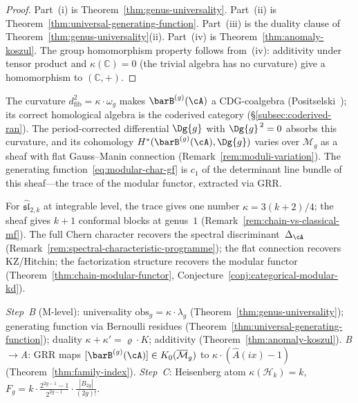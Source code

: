 \begin{proof}
Part~(i) is Theorem~\ref{thm:genus-universality}.
Part~(ii) is Theorem~\ref{thm:universal-generating-function}.
Part~(iii) is the duality clause of
Theorem~\ref{thm:genus-universality}(ii).
Part~(iv) is Theorem~\ref{thm:anomaly-koszul}.
The group homomorphism property follows from~(iv): additivity
under tensor product and $\kappa(\mathbb{C}) = 0$ (the trivial
algebra has no curvature) give a homomorphism to $(\mathbb{C}, +)$.
\end{proof}

\begin{remark}%
\label{rem:theorem-d-integrability}%
%
The curvature $d_{\mathrm{fib}}^2 = \kappa \cdot \omega_g$
makes $\barB^{(g)}(\cA)$ a CDG-coalgebra
(Positselski~\cite{Positselski11}); its correct
homological algebra is the coderived category
(\S\ref{subsec:coderived-ran}).  The period-corrected
differential $\Dg{g}$ with $\Dg{g}^{\,2} = 0$
absorbs this curvature, and its cohomology
$H^*(\barB^{(g)}(\cA), \Dg{g})$ varies over
$\mathcal{M}_g$ as a sheaf with flat Gauss--Manin connection
(Remark~\ref{rem:moduli-variation}).  The generating
function~\eqref{eq:modular-char-gf} is $c_1$ of the
determinant line bundle of this sheaf---the trace of the
modular functor, extracted via GRR.

For $\widehat{\mathfrak{sl}}_{2,k}$ at integrable level, the
trace gives one number $\kappa = 3(k{+}2)/4$; the sheaf
gives $k{+}1$ conformal blocks at genus~$1$
(Remark~\ref{rem:chain-vs-classical-mf}).  The full Chern
character recovers the spectral
discriminant~$\Delta_{\cA}$
(Remark~\ref{rem:spectral-characteristic-programme});
the flat connection recovers
KZ/Hitchin; the factorization structure recovers the modular
functor (Theorem~\ref{thm:chain-modular-functor},
Conjecture~\ref{conj:categorical-modular-kd}).
\end{remark}

\begin{remark}
\label{rem:theorem-d-model}
\emph{Step~B} (M-level): universality
$\mathrm{obs}_g=\kappa\cdot\lambda_g$
(Theorem~\ref{thm:genus-universality}); generating function via
Bernoulli residues (Theorem~\ref{thm:universal-generating-function});
duality $\kappa+\kappa'=\varrho\cdot K$; additivity
(Theorem~\ref{thm:anomaly-koszul}).
\emph{B$\to$A}: GRR maps $[\barB^{(g)}(\cA)]\in K_0(\overline{\mathcal{M}}_g)$
to $\kappa\cdot(\hat{A}(ix)-1)$ (Theorem~\ref{thm:family-index}).
\emph{Step~C}: Heisenberg atom $\kappa(\mathcal{H}_k)=k$,
$F_g=k\cdot\frac{2^{2g-1}-1}{2^{2g-1}}\cdot\frac{|B_{2g}|}{(2g)!}$.
\end{remark}


